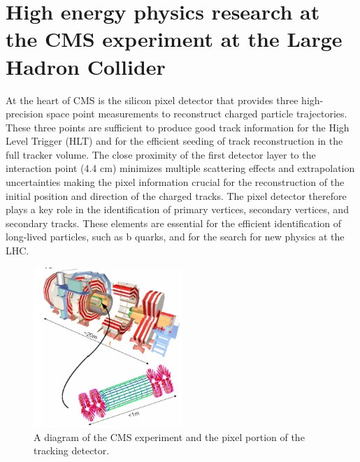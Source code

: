 \section{High energy physics research at the CMS 
     experiment at the Large Hadron Collider}


At the heart of CMS is the silicon pixel detector that provides three
high-precision space point measurements to reconstruct charged
particle trajectories. These three points are sufficient to produce
good track information for the High Level Trigger (HLT) and for the
efficient seeding of track reconstruction in the full tracker
volume. The close proximity of the first detector layer to the
interaction point (4.4 cm) minimizes multiple scattering effects and
extrapolation uncertainties making the pixel information crucial for
the reconstruction of the initial position and direction of the
charged tracks. The pixel detector therefore plays a key role in the
identification of primary vertices, secondary vertices, and secondary
tracks. These elements are essential for the efficient identification
of long-lived particles, such as b quarks, and for the search for new
physics at the LHC.

\begin{figure}[htb]
  \centering
  \includegraphics[width=0.5\textwidth]{CMS_detector_low_res.png}
  \caption{\label{fig:cms}
    A diagram of the CMS experiment and the pixel portion of the
    tracking detector.
  }
\end{figure}

